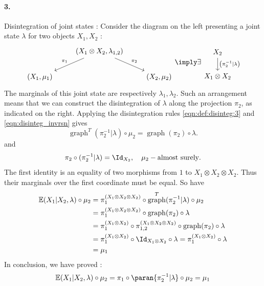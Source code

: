 \documentclass[12pt,oneside,pb-diagram]{article}
\DeclareMathOperator{\graph}{graph}
\begin{document}
\paragraph{3.} Disintegration of joint states : Consider the diagram on the left presenting a joint state $\lambda$ for two objects $X_1, X_2$ :
%
\[\begin{tikzcd}
	& (X_1 \otimes X_2, \lambda_{1,2} ) \arrow[dl, "\pi_1"'] \arrow[dr, "\pi_2"] \\
	(X_1, \mu_1) & & (X_2, \mu_2)
\end{tikzcd} \imply 
\exists \begin{tikzcd} X_2 \arrow[d, "\left( \pi^{-1}_2 | \lambda \right)"] \\ X_1 \otimes X_2 \end{tikzcd} 
\]
%
The marginals of this joint state are respectively $\lambda_1, \lambda_2$. Such an arrangement means that we can construct the disintegration of $\lambda$ along the projection $\pi_2$, as indicated on the right. Applying the disintegration rules \eqref{eqn:def:disinteg:3} and \eqref{eqn:disinteg_invrsn} gives 
%
\[ \graph^T(\pi_2^{-1}|\lambda) \circ \mu_2 = \graph(\pi_2) \circ \lambda .\]
%
and
%
\[ \pi_2\circ ( \pi_2^{-1}| \lambda ) = \Id_{X_2}, \quad \mu_2-\mbox{almost surely} . \]
%
The first identity is an equality of two morphisms from $1$ to $X_1 \otimes X_2 \otimes X_2$. Thus their marginals over the first coordinate must be equal. So have
%
\[\begin{split}
	\mathbb{E}( X_1 | X_2, \lambda ) \circ \mu_2
	&= \pi^{(X_1 \otimes X_2 \otimes X_2)}_{1} \circ \graph^T(\pi_2^{-1}|\lambda) \circ \mu_2 \\
	&= \pi^{(X_1 \otimes X_2 \otimes X_2)}_{1} \circ \graph(\pi_2) \circ \lambda \\
	&= \pi^{(X_1 \otimes X_2)}_{1} \circ \pi^{(X_1 \otimes X_2 \otimes X_2)}_{1,2} \circ \graph(\pi_2) \circ \lambda \\
	&= \pi^{(X_1 \otimes X_2)}_{1} \circ \Id_{X_1 \otimes X_2} \circ \lambda = \pi^{(X_1 \otimes X_2)}_{1} \circ \lambda \\
	&= \mu_1
\end{split}\]
%
In conclusion, we have proved : 
\begin{equation} \label{eqn:fsoh0}
	\mathbb{E}( X_1 | X_2, \lambda ) \circ \mu_2 = \pi_1 \circ \paran{ \pi_2^{-1} | \lambda } \circ \mu_2 = \mu_1
\end{equation}
%

\end{document}
